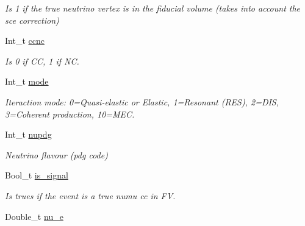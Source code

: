 \begin{DoxyCompactItemize}
\begin{DoxyCompactList}\small\item\em Is 1 if the true neutrino vertex is in the fiducial volume (takes into account the sce correction) \end{DoxyCompactList}\item 
\hypertarget{classUBXSecEvent_a6a55ef25451d4a8206055d588b052caf}{Int\-\_\-t \hyperlink{classUBXSecEvent_a6a55ef25451d4a8206055d588b052caf}{ccnc}}\label{classUBXSecEvent_a6a55ef25451d4a8206055d588b052caf}

\begin{DoxyCompactList}\small\item\em Is 0 if C\-C, 1 if N\-C. \end{DoxyCompactList}\item 
\hypertarget{classUBXSecEvent_ad9e14416b90b2b688ce1ff6361f8448a}{Int\-\_\-t \hyperlink{classUBXSecEvent_ad9e14416b90b2b688ce1ff6361f8448a}{mode}}\label{classUBXSecEvent_ad9e14416b90b2b688ce1ff6361f8448a}

\begin{DoxyCompactList}\small\item\em Iteraction mode\-: 0=Quasi-\/elastic or Elastic, 1=Resonant (R\-E\-S), 2=D\-I\-S, 3=Coherent production, 10=M\-E\-C. \end{DoxyCompactList}\item 
\hypertarget{classUBXSecEvent_a61f5c298a7cebb0c5286b4ed4c7a0627}{Int\-\_\-t \hyperlink{classUBXSecEvent_a61f5c298a7cebb0c5286b4ed4c7a0627}{nupdg}}\label{classUBXSecEvent_a61f5c298a7cebb0c5286b4ed4c7a0627}

\begin{DoxyCompactList}\small\item\em Neutrino flavour (pdg code) \end{DoxyCompactList}\item 
\hypertarget{classUBXSecEvent_a2cc7d9f302e0d413ece8af96b35fcff0}{Bool\-\_\-t \hyperlink{classUBXSecEvent_a2cc7d9f302e0d413ece8af96b35fcff0}{is\-\_\-signal}}\label{classUBXSecEvent_a2cc7d9f302e0d413ece8af96b35fcff0}

\begin{DoxyCompactList}\small\item\em Is trues if the event is a true numu cc in F\-V. \end{DoxyCompactList}\item 
\hypertarget{classUBXSecEvent_a715a5f6d8143a633109ed48fb87e0bbd}{Double\-\_\-t \hyperlink{classUBXSecEvent_a715a5f6d8143a633109ed48fb87e0bbd}{nu\-\_\-e}}\label{classUBXSecEvent_a715a5f6d8143a633109ed48fb87e0bbd}


\end{DoxyCompactItemize}

